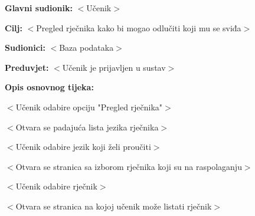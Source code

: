 					\noindent {}
					\begin{packed_item}
	
						\item \textbf{Glavni sudionik: }$<$Učenik$>$
						\item  \textbf{Cilj:} $<$Pregled rječnika kako bi mogao odlučiti koji mu se sviđa$>$
						\item  \textbf{Sudionici:} $<$Baza podataka$>$
						\item  \textbf{Preduvjet:} $<$Učenik je prijavljen u sustav$>$
						\item  \textbf{Opis osnovnog tijeka:}
						
						\item[] \begin{packed_enum}
	
							\item $<$Učenik odabire opciju "Pregled rječnika"$>$
							\item $<$Otvara se padajuća lista jezika rječnika$>$
							\item $<$Učenik odabire jezik koji želi proučiti$>$
							\item $<$Otvara se stranica sa izborom rječnika koji su na raspolaganju$>$
							\item $<$Učenik odabire rječnik$>$
							\item $<$Otvara se stranica na kojoj učenik može listati rječnik$>$
						\end{packed_enum}
						
					\end{packed_item}


